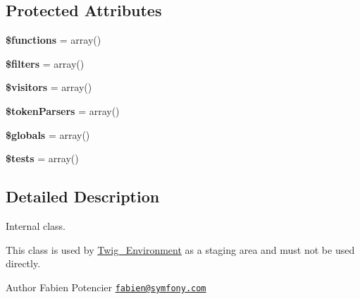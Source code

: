\subsection*{Protected Attributes}
\begin{DoxyCompactItemize}
\item 
\hypertarget{class_twig___extension___staging_aa75daea491817f3b64daa2f51128bcdf}{}{\bfseries \$functions} = array()\label{class_twig___extension___staging_aa75daea491817f3b64daa2f51128bcdf}

\item 
\hypertarget{class_twig___extension___staging_ae222f32233a38635bef58d24a13c9df5}{}{\bfseries \$filters} = array()\label{class_twig___extension___staging_ae222f32233a38635bef58d24a13c9df5}

\item 
\hypertarget{class_twig___extension___staging_a63a73490fa0428629a602fd9042a95aa}{}{\bfseries \$visitors} = array()\label{class_twig___extension___staging_a63a73490fa0428629a602fd9042a95aa}

\item 
\hypertarget{class_twig___extension___staging_ae54fee7b7fa068ce550c62e7e16eeb52}{}{\bfseries \$token\+Parsers} = array()\label{class_twig___extension___staging_ae54fee7b7fa068ce550c62e7e16eeb52}

\item 
\hypertarget{class_twig___extension___staging_aab94a86ac6c11a08ea99c0662106ec1e}{}{\bfseries \$globals} = array()\label{class_twig___extension___staging_aab94a86ac6c11a08ea99c0662106ec1e}

\item 
\hypertarget{class_twig___extension___staging_a6d7f4b753e7eb18b328a7eeba5e0094f}{}{\bfseries \$tests} = array()\label{class_twig___extension___staging_a6d7f4b753e7eb18b328a7eeba5e0094f}

\end{DoxyCompactItemize}


\subsection{Detailed Description}
Internal class.

This class is used by \hyperlink{class_twig___environment}{Twig\+\_\+\+Environment} as a staging area and must not be used directly.

\begin{DoxyAuthor}{Author}
Fabien Potencier \href{mailto:fabien@symfony.com}{\tt fabien@symfony.\+com} 
\end{DoxyAuthor}


